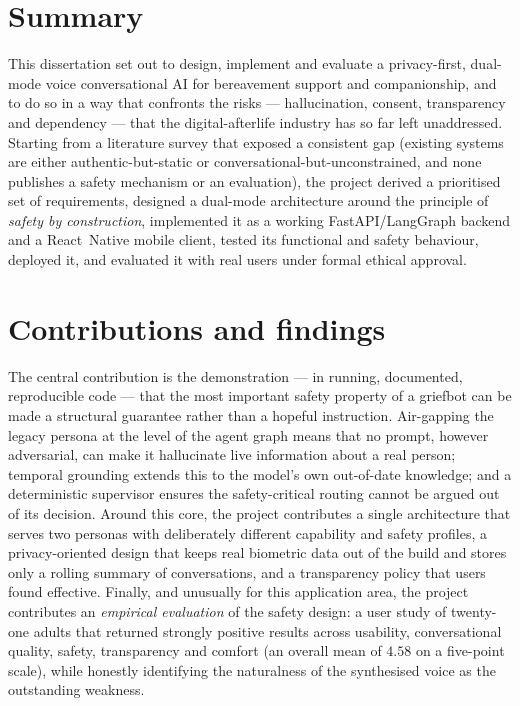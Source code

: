 \documentclass[11pt,a4paper]{report}
\begin{document}
\section{Summary}
This dissertation set out to design, implement and evaluate a privacy-first, dual-mode voice conversational AI for bereavement support and companionship, and to do so in a way that confronts the risks --- hallucination, consent, transparency and dependency --- that the digital-afterlife industry has so far left unaddressed. Starting from a literature survey that exposed a consistent gap (existing systems are either authentic-but-static or conversational-but-unconstrained, and none publishes a safety mechanism or an evaluation), the project derived a prioritised set of requirements, designed a dual-mode architecture around the principle of \emph{safety by construction}, implemented it as a working FastAPI/LangGraph backend and a React~Native mobile client, tested its functional and safety behaviour, deployed it, and evaluated it with real users under formal ethical approval.

\section{Contributions and findings}
The central contribution is the demonstration --- in running, documented, reproducible code --- that the most important safety property of a griefbot can be made a structural guarantee rather than a hopeful instruction. Air-gapping the legacy persona at the level of the agent graph means that no prompt, however adversarial, can make it hallucinate live information about a real person; temporal grounding extends this to the model's own out-of-date knowledge; and a deterministic supervisor ensures the safety-critical routing cannot be argued out of its decision. Around this core, the project contributes a single architecture that serves two personas with deliberately different capability and safety profiles, a privacy-oriented design that keeps real biometric data out of the build and stores only a rolling summary of conversations, and a transparency policy that users found effective. Finally, and unusually for this application area, the project contributes an \emph{empirical evaluation} of the safety design: a user study of twenty-one adults that returned strongly positive results across usability, conversational quality, safety, transparency and comfort (an overall mean of $4.58$ on a five-point scale), while honestly identifying the naturalness of the synthesised voice as the outstanding weakness.
\end{document}
